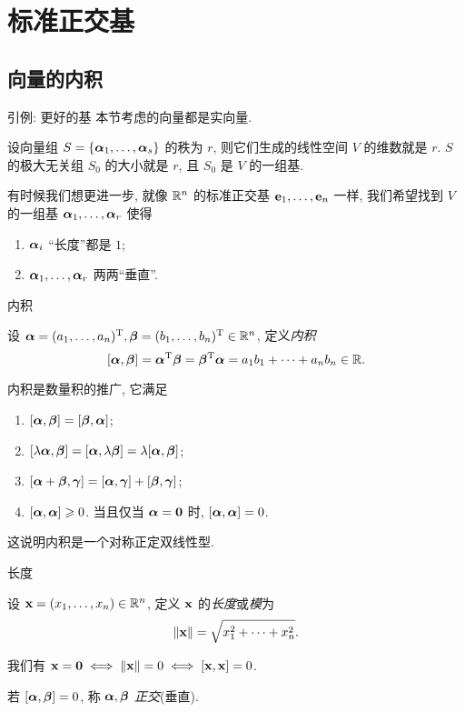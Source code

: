 \section{标准正交基}

\subsection{向量的内积}

\begin{frame}{引例: 更好的基}
	\onslide<+->
	本节考虑的向量都是实向量.

	\onslide<+->
	设向量组 $S=\{\bma_1,\dots,\bma_s\}$ 的秩为 $r$, 则它们生成的线性空间 $V$ 的维数就是 $r$.
	\onslide<+->
	$S$ 的极大无关组 $S_0$ 的大小就是 $r$, 且 $S_0$ 是 $V$ 的一组基.

	\onslide<+->
	有时候我们想更进一步, 就像 $\BR^n$ 的标准正交基 $\bfe_1,\dots,\bfe_n$ 一样, 我们希望找到 $V$ 的一组基 $\bma_1,\dots,\bma_r$ 使得
	\begin{enumerate}
		\item $\bma_i$ ``长度''都是 $1$;
		\item $\bma_1,\dots,\bma_r$ 两两``垂直''.
	\end{enumerate}
\end{frame}


\begin{frame}{内积}
	\onslide<+->
	\begin{definition}
		设 $\bma=(a_1,\dots,a_n)^\rmT,\bmb=(b_1,\dots,b_n)^\rmT\in\BR^n$, 定义\emph{内积}
		\[[\bma,\bmb]=\bma^\rmT\bmb=\bmb^\rmT\bma=a_1b_1+\cdots+a_nb_n\in\BR.\]
	\end{definition}
	\onslide<+->
	内积是数量积的推广, 它满足
	\begin{enumerate}
		\item $[\bma,\bmb]=[\bmb,\bma]$;
		\item $[\lambda\bma,\bmb]=[\bma,\lambda\bmb]=\lambda[\bma,\bmb]$;
		\item $[\bma+\bmb,\bmg]=[\bma,\bmg]+[\bmb,\bmg]$;
		\item $[\bma,\bma]\ge 0$. 当且仅当 $\bma={\bf0}$ 时, $[\bma,\bma]=0$.
	\end{enumerate}
	\onslide<+->
	这说明内积是一个对称正定双线性型.
\end{frame}


\begin{frame}{长度}
	\onslide<+->
	\begin{definition}
		设 $\bfx=(x_1,\dots,x_n)\in\BR^n$, 定义 $\bfx$ 的\emph{长度}或\emph{模}为
		\[\|\bfx\|=\sqrt{x_1^2+\cdots+x_n^2}.\]
	\end{definition}
	\onslide<+->
	我们有 $\bfx={\bf0}\iff\|\bfx\|=0\iff[\bfx,\bfx]=0$.
	\onslide<+->
	\begin{definition}
		若 $[\bma,\bmb]=0$, 称 $\bma,\bmb$ \emph{正交}(垂直).
	\end{definition}
\end{frame}


